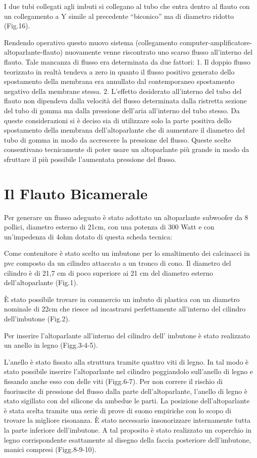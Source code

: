 I due tubi collegati agli imbuti si collegano al tubo che entra dentro al flauto con un collegamento a Y simile al precedente “biconico” ma di diametro ridotto (Fig.16).

Rendendo operativo questo muovo sistema (collegamento computer-amplificatore-altoparlante-flauto) nuovamente venne riscontrato uno scarso flusso all’interno del flauto. Tale mancanza di flusso era determinata da due fattori:
1. Il doppio flusso teorizzato in realtà tendeva a zero in quanto il flusso positivo generato dello spostamento della membrana era annullato dal contemporaneo spostamento negativo della membrane stessa.
2. L’effetto desiderato all’interno del tubo del flauto non dipendeva dalla         velocità del flusso determinata dalla ristretta sezione del tubo di gomma ma dalla pressione dell’aria all’interno del tubo stesso.
Da queste considerazioni si è deciso sia di utilizzare solo la parte positiva dello spostamento della membrana dell’altoparlante che di aumentare il diametro del tubo di gomma in modo da accrescere la pressione del flusso.
Queste scelte consentivano tecnicamente di poter usare un altoparlante più grande in modo da sfruttare il più possibile l’aumentata pressione del flusso.

\section{Il Flauto Bicamerale}

Per generare un flusso adeguato è stato adottato un altoparlante subwoofer da 8 pollici, diametro esterno di 21cm, con una potenza di 300 Watt e con un’impedenza di 4ohm dotato di questa scheda tecnica:

Come contenitore è stato scelto un imbutone per lo smaltimento dei calcinacci in pvc composto da un cilindro attaccato a un tronco di cono.
Il diametro del cilindro è di 21,7 cm di poco superiore ai 21 cm del diametro esterno dell’altoparlante (Fig.1).

È stato possibile trovare in commercio un imbuto di plastica con un diametro nominale di 22cm che riesce ad incastrarsi perfettamente all’interno del cilindro dell’imbutone (Fig.2).

Per inserire l’altoparlante all’interno del cilindro dell’ imbutone è stato realizzato un anello in legno (Figg.3-4-5).

L’anello è stato fissato alla struttura tramite quattro viti di legno. In tal modo è stato possibile inserire l’altoparlante nel cilindro poggiandolo sull’anello di legno e fissando anche esso con delle viti (Figg.6-7). Per non correre il rischio di fuoriuscite di pressione del flusso dalla parte dell’altoparlante, l’anello di legno è stato sigillato con del silicone da ambedue le parti.
La posizione dell’altoparlante è stata scelta tramite una serie di prove di suono empiriche con lo scopo di trovare la migliore risonanza.
È stato necessario insonorizzare internamente tutta la parte inferiore dell’imbutone. A tal proposito è stato realizzato un coperchio in legno corrispondente esattamente al disegno della faccia posteriore dell’imbutone, manici compresi (Figg.8-9-10).


